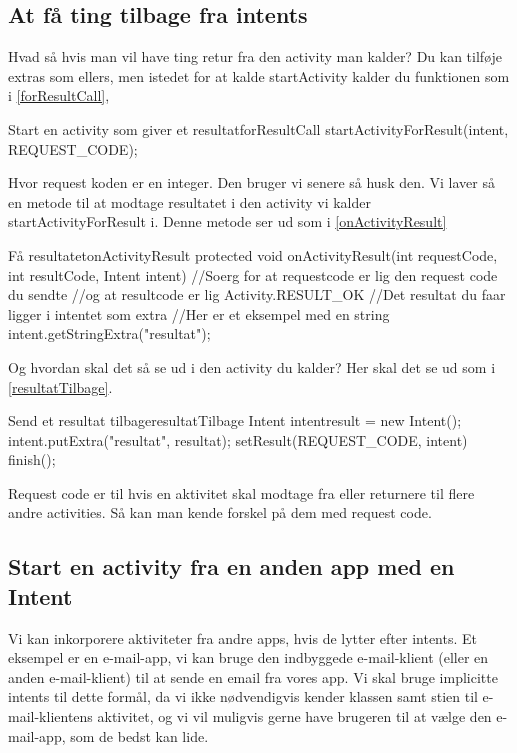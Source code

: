 \subsection{At få ting tilbage fra intents}
Hvad så hvis man vil have ting retur fra den activity man kalder? Du kan tilføje extras som ellers, men istedet for at kalde startActivity kalder du funktionen som i \autoref{forResultCall},
\begin{JavaCode}{Start en activity som giver et resultat}{forResultCall}
	startActivityForResult(intent, REQUEST_CODE);
\end{JavaCode}
Hvor request koden er en integer. Den bruger vi senere så husk den. Vi laver så en metode til at modtage resultatet i den activity vi kalder startActivityForResult i. Denne metode ser ud som i \autoref{onActivityResult}
\begin{JavaCode}{Få resultatet}{onActivityResult}
	protected void onActivityResult(int requestCode, int resultCode, Intent intent){
		//Soerg for at requestcode er lig den request code du sendte
		//og at resultcode er lig Activity.RESULT_OK
		//Det resultat du faar ligger i intentet som extra
		//Her er et eksempel med en string
		intent.getStringExtra("resultat");
	}
\end{JavaCode}

Og hvordan skal det så se ud i den activity du kalder? Her skal det se ud som i \autoref{resultatTilbage}.
\begin{JavaCode}{Send et resultat tilbage}{resultatTilbage}
	Intent intentresult = new Intent();
	intent.putExtra("resultat", resultat);
	setResult(REQUEST_CODE, intent)
	finish();
\end{JavaCode}
Request code er til hvis en aktivitet skal modtage fra eller returnere til flere andre activities. Så kan man kende forskel på dem med request code. 

\subsection{Start en activity fra en anden app med en Intent}

Vi kan inkorporere aktiviteter fra andre apps, hvis de lytter efter intents. Et eksempel er en e-mail-app, vi kan bruge den indbyggede e-mail-klient (eller en anden e-mail-klient) til at sende en email fra vores app. Vi skal bruge implicitte intents til dette formål, da vi ikke nødvendigvis kender klassen samt stien til e-mail-klientens aktivitet, og vi vil muligvis gerne have brugeren til at vælge den e-mail-app, som de bedst kan lide.

